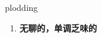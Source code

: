 
\begin{frame}
{\huge plodding}
\begin{center}
\begin{enumerate}\Large
  \item \textbf{无聊的，单调乏味的}
\end{enumerate}
\end{center}
\end{frame}
